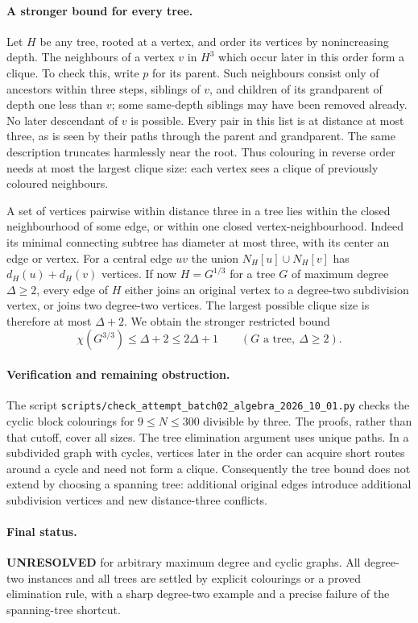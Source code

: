 \documentclass[11pt,a4paper]{article}
\begin{document}
\paragraph{A stronger bound for every tree.}
Let $H$ be any tree, rooted at a vertex, and order its vertices
by nonincreasing depth. The neighbours of a vertex $v$ in $H^3$
which occur later in this order form a clique. To check this,
write $p$ for its parent. Such neighbours consist only of ancestors
within three steps, siblings of $v$, and children of its
grandparent of depth one less than $v$; some same-depth siblings
may have been removed already. No later descendant of $v$ is
possible. Every pair in this list is at distance at most three,
as is seen by their paths through the parent and grandparent.
The same description truncates harmlessly near the root.
Thus colouring in reverse order needs at most the largest clique
size: each vertex sees a clique of previously coloured neighbours.

A set of vertices pairwise within distance three in a tree lies
within the closed neighbourhood of some edge, or within one
closed vertex-neighbourhood. Indeed its minimal connecting subtree
has diameter at most three, with its center an edge or vertex.
For a central edge $uv$ the union $N_H[u]\cup N_H[v]$ has
$d_H(u)+d_H(v)$ vertices. If now $H=G^{1/3}$ for a tree $G$
of maximum degree $\Delta\ge2$, every edge of $H$ either joins
an original vertex to a degree-two subdivision vertex, or joins
two degree-two vertices. The largest possible clique size is
therefore at most $\Delta+2$. We obtain the stronger restricted
bound
\[
 \chi(G^{3/3})\le\Delta+2\le2\Delta+1
 \qquad(G\text{ a tree},\ \Delta\ge2).
\]

\paragraph{Verification and remaining obstruction.}
The script
\texttt{scripts/check\_attempt\_batch02\_algebra\_2026\_10\_01.py}
checks the cyclic block colourings for $9\le N\le300$ divisible
by three. The proofs, rather than that cutoff, cover all sizes.
The tree elimination argument uses unique paths. In a subdivided
graph with cycles, vertices later in the order can acquire short
routes around a cycle and need not form a clique. Consequently
the tree bound does not extend by choosing a spanning tree:
additional original edges introduce additional subdivision vertices
and new distance-three conflicts.

\paragraph{Final status.}
\textbf{UNRESOLVED} for arbitrary maximum degree and cyclic graphs.
All degree-two instances and all trees are settled by explicit
colourings or a proved elimination rule, with a sharp degree-two
example and a precise failure of the spanning-tree shortcut.
\end{document}
